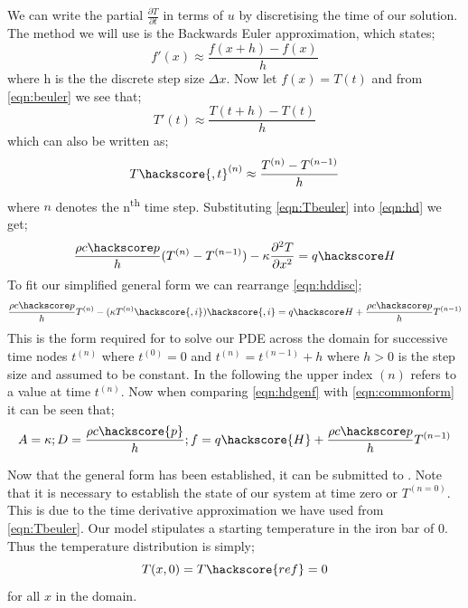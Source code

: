 We can write the partial $\frac{\partial T}{\partial t}$ in terms of $u$ by discretising the time of our solution. The method we will use is the Backwards Euler approximation, which states;
\begin{equation}
f'(x) \approx \frac{f(x+h)-f(x)}{h}
\label{eqn:beuler}
\end{equation}
where h is the the discrete step size $\Delta x$.
Now let $f(x) = T(t)$ and from \ref{eqn:beuler} we see that;
\begin{equation}
T'(t) \approx \frac{T(t+h) - T(t)}{h}
\end{equation}
which can also be written as;
\begin{equation}
T\hackscore{,t}^{(n)} \approx \frac{T^{(n)} - T^{(n-1)}}{h}
\label{eqn:Tbeuler}
\end{equation}
where $n$ denotes the n\textsuperscript{th} time step. Substituting \ref{eqn:Tbeuler} into \ref{eqn:hd} we get;
\begin{equation}
\frac{\rho c\hackscore p}{h} (T^{(n)} - T^{(n-1)}) - \kappa \frac{\partial^{2} T}{\partial x^{2}} = q\hackscore H 
\label{eqn:hddisc}
\end{equation}
To fit our simplified general form we can rearrange \ref{eqn:hddisc};
\begin{equation}
\frac{\rho c\hackscore p}{h} T^{(n)} - (\kappa T^{(n)}\hackscore{,i})\hackscore{,i} = q\hackscore H +  \frac{\rho c\hackscore p}{h} T^{(n-1)}
\label{eqn:hdgenf}
\end{equation}
This is the form required for \ESCRIPT to solve our PDE across the domain for successive time nodes $t^{(n)}$ where 
$t^{(0)}=0$ and  $t^{(n)}=t^{(n-1)}+h$ where $h>0$ is the step size and assumed to be constant. 
In the following the upper index ${(n)}$ refers to a value at time $t^{(n)}$. Now when comparing \ref{eqn:hdgenf} with \ref{eqn:commonform} it can be seen that;
\begin{equation}
A = \kappa; D = \frac{\rho c \hackscore{p}}{h}; f = q \hackscore{H} + \frac{\rho c\hackscore p}{h} T^{(n-1)}
\end{equation}

Now that the general form has been established, it can be submitted to \ESCRIPT. Note that it is necessary to establish the state of our system at time zero or $T^{(n=0)}$. This is due to the time derivative approximation we have used from \ref{eqn:Tbeuler}. Our model stipulates a starting temperature in the iron bar of 0\textcelsius. Thus the temperature distribution is simply;
\begin{equation}
T(x,0) = T\hackscore{ref} = 0
\end{equation}
for all $x$ in the domain. 

